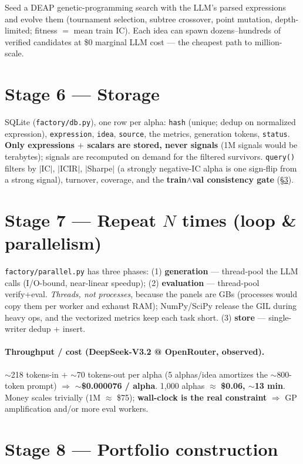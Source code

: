 \documentclass[11pt]{article}
\newcommand{\code}[1]{\texttt{#1}}
\newcommand{\file}[1]{\texttt{#1}}
\begin{document}
Seed a DEAP genetic-programming search with the LLM's parsed expressions and evolve
them (tournament selection, subtree crossover, point mutation, depth-limited;
fitness $=$ mean train IC). Each idea can spawn dozens--hundreds of verified
candidates at \$0 marginal LLM cost --- the cheapest path to million-scale.

\section{Stage 6 --- Storage}

SQLite (\file{factory/db.py}), one row per alpha: \code{hash} (unique; dedup on
normalized expression), \code{expression}, \code{idea}, \code{source}, the metrics,
generation tokens, \code{status}. \textbf{Only expressions $+$ scalars are stored,
never signals} (1M signals would be terabytes); signals are recomputed on demand for
the filtered survivors. \code{query()} filters by $|$IC$|$, $|$ICIR$|$, $|$Sharpe$|$
(a strongly negative-IC alpha is one sign-flip from a strong signal), turnover,
coverage, and the \textbf{train$\wedge$val consistency gate} (\S\ref{sec:portfolio}).

\section{Stage 7 --- Repeat $N$ times (loop \& parallelism)}

\file{factory/parallel.py} has three phases: (1) \textbf{generation} ---
thread-pool the LLM calls (I/O-bound, near-linear speedup); (2) \textbf{evaluation}
--- thread-pool verify+eval. \emph{Threads, not processes}, because the panels are
GBs (processes would copy them per worker and exhaust RAM); NumPy/SciPy release the
GIL during heavy ops, and the vectorized metrics keep each task short.
(3) \textbf{store} --- single-writer dedup + insert.

\paragraph{Throughput / cost (DeepSeek-V3.2 @ OpenRouter, observed).}
$\sim$218 tokens-in $+$ $\sim$70 tokens-out per alpha (5 alphas/idea amortizes the
$\sim$800-token prompt) $\Rightarrow$ \textbf{$\sim$\$0.000076 / alpha}.
1{,}000 alphas $\approx$ \textbf{\$0.06, $\sim$13 min}. Money scales trivially
(1M $\approx$ \$75); \textbf{wall-clock is the real constraint} $\Rightarrow$ GP
amplification and/or more eval workers.

\section{Stage 8 --- Portfolio construction}
\label{sec:portfolio}
\end{document}
